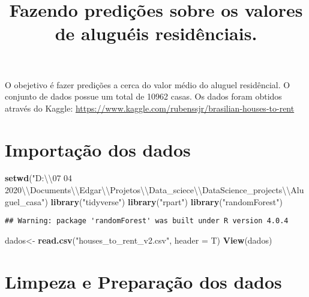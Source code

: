 \documentclass[
]{article}
\title{Fazendo predições sobre os valores de aluguéis residênciais.}
\author{}
\date{\vspace{-2.5em}}
\newenvironment{Shaded}{\begin{snugshade}}{\end{snugshade}}
\newcommand{\CharTok}[1]{\textcolor[rgb]{0.31,0.60,0.02}{#1}}
\newcommand{\DataTypeTok}[1]{\textcolor[rgb]{0.13,0.29,0.53}{#1}}
\newcommand{\KeywordTok}[1]{\textcolor[rgb]{0.13,0.29,0.53}{\textbf{#1}}}
\newcommand{\NormalTok}[1]{#1}
\newcommand{\StringTok}[1]{\textcolor[rgb]{0.31,0.60,0.02}{#1}}
\begin{document}
\maketitle

O obejetivo é fazer predições a cerca do valor médio do aluguel
residêncial. O conjunto de dados possue um total de 10962 casas. Os
dados foram obtidos através do Kaggle:
\url{https://www.kaggle.com/rubenssjr/brasilian-houses-to-rent}

\hypertarget{importauxe7uxe3o-dos-dados}{%
\section{Importação dos dados}\label{importauxe7uxe3o-dos-dados}}

\begin{Shaded}
\begin{Highlighting}[]
\KeywordTok{setwd}\NormalTok{(}\StringTok{"D:}\CharTok{\textbackslash{}\textbackslash{}}\StringTok{07 04 2020}\CharTok{\textbackslash{}\textbackslash{}}\StringTok{Documents}\CharTok{\textbackslash{}\textbackslash{}}\StringTok{Edgar}\CharTok{\textbackslash{}\textbackslash{}}\StringTok{Projetos}\CharTok{\textbackslash{}\textbackslash{}}\StringTok{Data\_sciece}\CharTok{\textbackslash{}\textbackslash{}}\StringTok{DataScience\_projects}\CharTok{\textbackslash{}\textbackslash{}}\StringTok{Aluguel\_casa"}\NormalTok{)}
\KeywordTok{library}\NormalTok{(}\StringTok{"tidyverse"}\NormalTok{)}
\KeywordTok{library}\NormalTok{(}\StringTok{"rpart"}\NormalTok{)}
\KeywordTok{library}\NormalTok{(}\StringTok{"randomForest"}\NormalTok{)}
\end{Highlighting}
\end{Shaded}

\begin{verbatim}
## Warning: package 'randomForest' was built under R version 4.0.4
\end{verbatim}

\begin{Shaded}
\begin{Highlighting}[]
\NormalTok{dados\textless{}{-}}\StringTok{ }\KeywordTok{read.csv}\NormalTok{(}\StringTok{"houses\_to\_rent\_v2.csv"}\NormalTok{, }\DataTypeTok{header =}\NormalTok{ T)}
\KeywordTok{View}\NormalTok{(dados)}
\end{Highlighting}
\end{Shaded}

\hypertarget{limpeza-e-preparauxe7uxe3o-dos-dados}{%
\section{Limpeza e Preparação dos
dados}\label{limpeza-e-preparauxe7uxe3o-dos-dados}}
\end{document}
